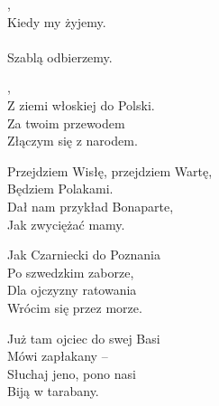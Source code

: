 \documentclass[a4paper,twoside,noinfo,nofrontmatter]{songbook}
\begin{document}
  \begin{lyrics}
    ,\\
    Kiedy my żyjemy.\\
    \\
    Szablą odbierzemy.
    
    \begin{chorus}%
      ,\\
      Z ziemi włoskiej do Polski.\\
      Za twoim przewodem\\
      Złączym się z narodem.
    \end{chorus}
    
    \begin{markverses}[marktext=costam]%
    Przejdziem Wisłę, przejdziem Wartę,\\
    Będziem Polakami.\\
    Dał nam przykład Bonaparte,\\
    Jak zwyciężać mamy.
    \end{markverses}
    
    \chorusref
    
    Jak Czarniecki do Poznania\\
    Po szwedzkim zaborze,\\
    Dla ojczyzny ratowania\\
    Wrócim się przez morze.
        
    \chorusref

    Już tam ojciec do swej Basi\\
    Mówi zapłakany --\\
    Słuchaj jeno, pono nasi\\
    Biją w tarabany.

    \chorusref
  \end{lyrics}



\begin{info}
    \lipsum
\end{info}
\end{document}
